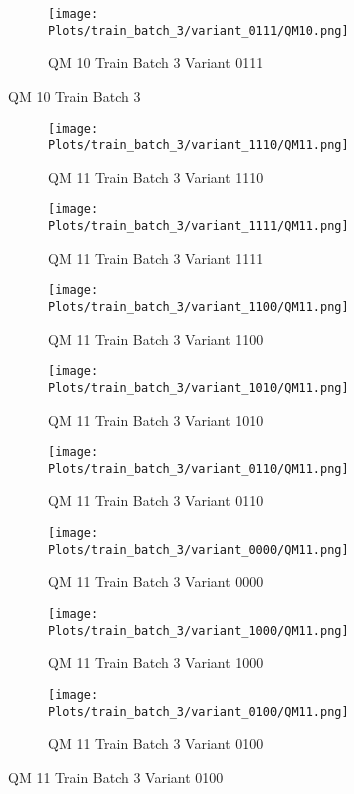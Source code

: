 \documentclass{DissertateFigs}
\begin{document}
\begin{figure}[t!]
\medskip

    \begin{subfigure}{0.47\textwidth}
    \texttt{[image: Plots/train\_batch\_3/variant\_0111/QM10.png]}
    \caption{QM 10 Train Batch 3 Variant 0111}
    \end{subfigure}
\caption{QM 10 Train Batch 3}
    \end{figure}
\clearpage
\begin{figure}[t!]
    \begin{subfigure}{0.47\textwidth}
    \texttt{[image: Plots/train\_batch\_3/variant\_1110/QM11.png]}
    \caption{QM 11 Train Batch 3 Variant 1110}
    \end{subfigure}
    \begin{subfigure}{0.47\textwidth}
    \texttt{[image: Plots/train\_batch\_3/variant\_1111/QM11.png]}
    \caption{QM 11 Train Batch 3 Variant 1111}
    \end{subfigure}

\medskip

    \begin{subfigure}{0.47\textwidth}
    \texttt{[image: Plots/train\_batch\_3/variant\_1100/QM11.png]}
    \caption{QM 11 Train Batch 3 Variant 1100}
    \end{subfigure}
    \begin{subfigure}{0.47\textwidth}
    \texttt{[image: Plots/train\_batch\_3/variant\_1010/QM11.png]}
    \caption{QM 11 Train Batch 3 Variant 1010}
    \end{subfigure}

\medskip

    \begin{subfigure}{0.47\textwidth}
    \texttt{[image: Plots/train\_batch\_3/variant\_0110/QM11.png]}
    \caption{QM 11 Train Batch 3 Variant 0110}
    \end{subfigure}
    \begin{subfigure}{0.47\textwidth}
    \texttt{[image: Plots/train\_batch\_3/variant\_0000/QM11.png]}
    \caption{QM 11 Train Batch 3 Variant 0000}
    \end{subfigure}

\medskip

    \begin{subfigure}{0.47\textwidth}
    \texttt{[image: Plots/train\_batch\_3/variant\_1000/QM11.png]}
    \caption{QM 11 Train Batch 3 Variant 1000}
    \end{subfigure}
    \begin{subfigure}{0.47\textwidth}
    \texttt{[image: Plots/train\_batch\_3/variant\_0100/QM11.png]}
    \caption{QM 11 Train Batch 3 Variant 0100}
    \end{subfigure}


\end{figure}
\end{document}
